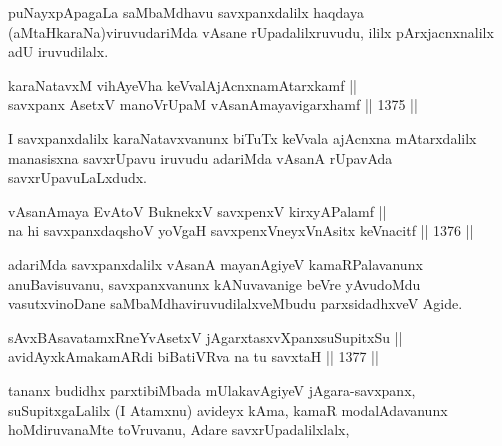 \begin{artha}
puNayxpApagaLa saMbaMdhavu savxpanxdalilx haqdaya (aMtaHkaraNa)viruvudariMda vAsane rUpadalilxruvudu, ililx pArxjacnxnalilx adU iruvudilalx.
\end{artha}


\begin{shl}
karaNatavxM vihAyeVha keVvalAjAcnxnamAtarxkamf || \\
savxpanx AsetxV manoVrUpaM vAsanAmayavigarxhamf \hfill || 1375 ||  
\end{shl}

\begin{artha}
I savxpanxdalilx karaNatavxvanunx biTuTx keVvala ajAcnxna mAtarxdalilx manasisxna savxrUpavu iruvudu adariMda vAsanA rUpavAda savxrUpavuLaLxdudx.
\end{artha}


\begin{shl}
vAsanAmaya EvAtoV BuknekxV savxpenxV kirxyAPalamf || \\
na hi savxpanxdaqshoV yoVgaH savxpenxV\s neyxVnAsitx keVnacitf \hfill || 1376 ||  
\end{shl}

\begin{artha}
adariMda savxpanxdalilx vAsanA mayanAgiyeV kamaRPalavanunx anuBavisuvanu, savxpanxvanunx kANuvavanige beVre yAvudoMdu vasutxvinoDane saMbaMdhaviruvudilalxveMbudu parxsidadhxveV Agide.
\end{artha}

\begin{shl}
sAvxBAsavatamxRneYvA\s \s setxV jAgarxtasxvXpanxsuSupitxSu || \\
avidAyxkAmakamARdi biBatiVRva na tu savxtaH \hfill || 1377 ||  
\end{shl}

\begin{artha}
tananx budidhx parxtibiMbada mUlakavAgiyeV jAgara-savxpanx, suSupitxgaLalilx (I Atamxnu) avideyx kAma, kamaR modalAdavanunx hoMdiruvanaMte toVruvanu, Adare savxrUpadalilxlalx, 
\end{artha}



